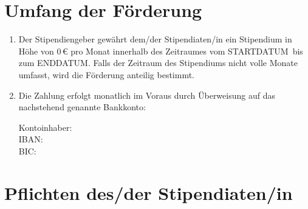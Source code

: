 \documentclass[
  paper=a4,
  fontsize=12pt,
  DIV=16,
  parskip=full,
  headinclude=true,
]{scrartcl}
\newcommand\stipbetrag{0}		%
\newcommand\stipstart{STARTDATUM}	%
\newcommand\stipende{ENDDATUM}		%
\newcommand\stipkontoinhaber{}		%
\newcommand\stipbic{}			%
\newcommand\stipiban{}			%
\begin{document}
\section{Umfang der Förderung}

\begin{enumerate}[\qquad(1)]
	\item Der Stipendiengeber gewährt dem/der Stipendiaten/in ein
		Stipendium in Höhe von \num{\stipbetrag}\,€ pro Monat innerhalb
		des Zeitraumes vom \stipstart\ bis zum \stipende.
		Falls der Zeitraum des Stipendiums nicht volle Monate umfasst, 
		wird die Förderung anteilig bestimmt. 
	\item Die Zahlung erfolgt monatlich im Voraus durch Überweisung auf
		das nachstehend genannte Bankkonto:

		Kontoinhaber: \stipkontoinhaber\\
		IBAN: \stipiban\\
		BIC: \stipbic\\
\end{enumerate}

\section{Pflichten des/der Stipendiaten/in}
\end{document}
